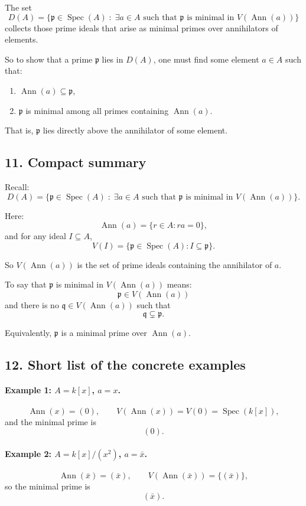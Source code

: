 \documentclass[12pt,a4paper]{article}
\theoremstyle{notespace}
\DeclareMathOperator{\Spec}{Spec}
\DeclareMathOperator{\Ann}{Ann}
\begin{document}
The set
\[
D(A)=\{\mathfrak p\in \Spec(A)\;:\;\exists a\in A \text{ such that }
\mathfrak p \text{ is minimal in } V(\Ann(a))\}
\]
collects those prime ideals that arise as minimal primes over annihilators of elements.

So to show that a prime \(\mathfrak p\) lies in \(D(A)\), one must find some element \(a\in A\) such that:

\begin{enumerate}
	\item \(\Ann(a)\subseteq \mathfrak p\),
	\item \(\mathfrak p\) is minimal among all primes containing \(\Ann(a)\).
\end{enumerate}

That is, \(\mathfrak p\) lies directly above the annihilator of some element.

\subsection*{11. Compact summary}

Recall:
\[
D(A)=\{\mathfrak p\in \Spec(A)\;:\;\exists a\in A \text{ such that }
\mathfrak p \text{ is minimal in } V(\Ann(a))\}.
\]

Here:
\[
\Ann(a)=\{r\in A:ra=0\},
\]
and for any ideal \(I\subseteq A\),
\[
V(I)=\{\mathfrak p\in \Spec(A): I\subseteq \mathfrak p\}.
\]

So \(V(\Ann(a))\) is the set of prime ideals containing the annihilator of \(a\).

To say that \(\mathfrak p\) is minimal in \(V(\Ann(a))\) means:
\[
\mathfrak p\in V(\Ann(a))
\]
and there is no \(\mathfrak q\in V(\Ann(a))\) such that
\[
\mathfrak q\subsetneq \mathfrak p.
\]

Equivalently, \(\mathfrak p\) is a minimal prime over \(\Ann(a)\).

\subsection*{12. Short list of the concrete examples}

\paragraph{Example 1: \(A=k[x]\), \(a=x\).}
\[
\Ann(x)=(0), \qquad V(\Ann(x))=V(0)=\Spec(k[x]),
\]
and the minimal prime is
\[
(0).
\]

\paragraph{Example 2: \(A=k[x]/(x^2)\), \(a=\bar x\).}
\[
\Ann(\bar x)=(\bar x), \qquad V(\Ann(\bar x))=\{(\bar x)\},
\]
so the minimal prime is
\[
(\bar x).
\]
\end{document}
